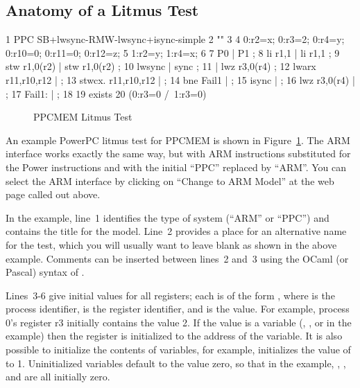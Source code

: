 \subsection{Anatomy of a Litmus Test}
\label{sec:formal:Anatomy of a Litmus Test}

{ \scriptsize
\begin{verbbox}
 1 PPC SB+lwsync-RMW-lwsync+isync-simple
 2 ""
 3 {
 4 0:r2=x; 0:r3=2; 0:r4=y; 0:r10=0; 0:r11=0; 0:r12=z;
 5 1:r2=y; 1:r4=x;
 6 }
 7  P0                 | P1           ;
 8  li r1,1            | li r1,1      ;
 9  stw r1,0(r2)       | stw r1,0(r2) ;
10  lwsync             | sync         ;
11                     | lwz r3,0(r4) ;
12  lwarx  r11,r10,r12 | ;
13  stwcx. r11,r10,r12 | ;
14  bne Fail1          | ;
15  isync              | ;
16  lwz r3,0(r4)       | ;
17  Fail1:             | ;
18 
19 exists
20 (0:r3=0 /\ 1:r3=0)
\end{verbbox}
}
\begin{figure}[tbp]
\centering
\theverbbox
\caption{PPCMEM Litmus Test}
\label{fig:sec:formal:PPCMEM Litmus Test}
\end{figure}

An example PowerPC litmus test for PPCMEM is shown in
Figure~\ref{fig:sec:formal:PPCMEM Litmus Test}.
The ARM interface works exactly the same way, but with ARM instructions
substituted for the Power instructions and with the initial ``PPC''
replaced by ``ARM''. You can select the ARM interface by clicking on
``Change to ARM Model'' at the web page called out above.

In the example, line~1 identifies the type of system (``ARM'' or ``PPC'')
and contains the title for the model. Line~2 provides a place for an
alternative name for the test, which you will usually want to leave
blank as shown in the above example. Comments can be inserted between
lines~2 and~3 using the OCaml (or Pascal) syntax of \nbco{(* *)}.

Lines~3-6 give initial values for all registers; each is of the form
, where  is the process identifier,  is the register
identifier, and  is the value. For example, process 0's register
r3 initially contains the value 2. If the value is a variable (,
, or  in the example) then the register is initialized to the
address of the variable. It is also possible to initialize the contents
of variables, for example,  initializes the value of  to
1. Uninitialized variables default to the value zero, so that in the
example, , , and  are all initially zero.

